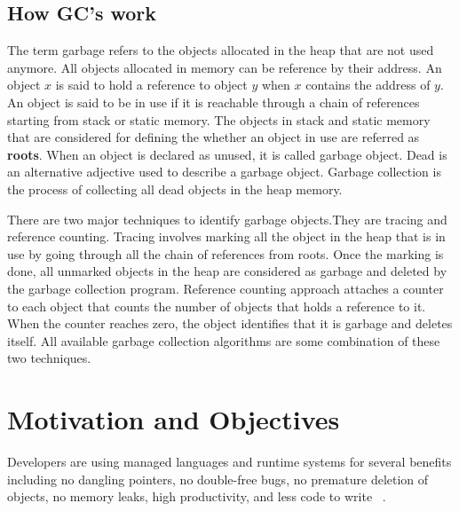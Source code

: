 \subsection{How GC's work}
The term garbage refers to the objects allocated in the heap that are not used anymore. All objects allocated in memory can be reference by their address. An object $x$ is said to hold a reference to object $y$ when $x$ contains the address of $y$. 
An object is said to be in use if it is reachable through a chain of references starting from stack or static memory.
The objects in stack and static memory that are considered for defining the whether an object in use are referred as \textbf{roots}.
When an object is declared as unused, it is called garbage object.
 Dead is an alternative adjective used to describe a garbage object. Garbage collection is the process of collecting all dead objects in the heap memory. 

There are two major techniques to identify garbage objects.They are tracing and reference counting. Tracing involves marking all the object in the heap that is in use by going through all the chain of references from roots. Once the marking is done, all unmarked objects in the heap are considered as garbage and deleted by the garbage collection program. Reference counting approach attaches a counter to each object that counts the number of objects that holds a reference to it. When the counter reaches zero, the object identifies that it is garbage and deletes itself. All available garbage collection algorithms are some combination of these two techniques.

\section{Motivation and Objectives}
\label{intro:motv}
Developers are using managed languages and runtime systems for several benefits including no dangling pointers, no double-free bugs, no premature deletion of objects, no memory leaks, high productivity, and less code to write ~\cite{Butters}.  
\begin{comment}
The main advantage of the garbage collections are 
\begin{enumerate}
\item Dangling Pointers
\item Double free bugs
\item Memory Leaks
\end{enumerate}
\end{comment}
